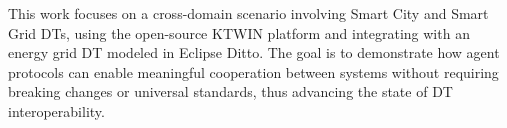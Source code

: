 This work focuses on a cross-domain scenario involving Smart City and Smart Grid DTs, using the open-source KTWIN platform and integrating with an energy grid DT modeled in Eclipse Ditto. The goal is to demonstrate how agent protocols can enable meaningful cooperation between systems without requiring breaking changes or universal standards, thus advancing the state of DT interoperability.






